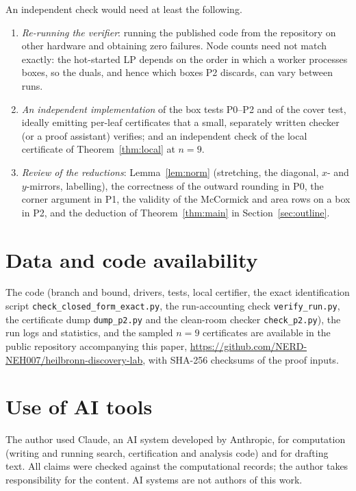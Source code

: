\documentclass[11pt]{amsart}
\newcommand{\repourl}{\url{https://github.com/NERD-NEH007/heilbronn-discovery-lab}}
\theoremstyle{definition}
\begin{document}
An independent check would need at least the following.
\begin{enumerate}[label=(\roman*)]
\item \emph{Re-running the verifier}: running the published code from the repository on other hardware and obtaining zero failures. Node counts need not match exactly: the hot-started LP depends on the order in which a worker processes boxes, so the duals, and hence which boxes P2 discards, can vary between runs.
\item \emph{An independent implementation} of the box tests P0--P2 and of the cover test, ideally emitting per-leaf certificates that a small, separately written checker (or a proof assistant) verifies; and an independent check of the local certificate of Theorem~\ref{thm:local} at $n = 9$.
\item \emph{Review of the reductions}: Lemma~\ref{lem:norm} (stretching, the diagonal, $x$- and $y$-mirrors, labelling), the correctness of the outward rounding in P0, the corner argument in P1, the validity of the McCormick and area rows on a box in P2, and the deduction of Theorem~\ref{thm:main} in Section~\ref{sec:outline}.
\end{enumerate}

\section*{Data and code availability}
The code (branch and bound, drivers, tests, local certifier, the exact identification script \texttt{check\_closed\_form\_exact.py}, the run-accounting check \texttt{verify\_run.py}, the certificate dump \texttt{dump\_p2.py} and the clean-room checker \texttt{check\_p2.py}), the run logs and statistics, and the sampled $n = 9$ certificates are available in the public repository accompanying this paper, \repourl, with SHA-256 checksums of the proof inputs. %

\section*{Use of AI tools}
The author used Claude, an AI system developed by Anthropic, for computation (writing and running search, certification and analysis code) and for drafting text. All claims were checked against the computational records; the author takes responsibility for the content. AI systems are not authors of this work.
\end{document}
